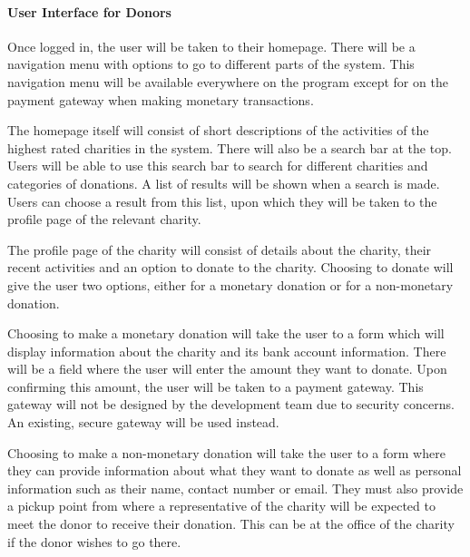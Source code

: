 \documentclass{scrreprt}
\begin{document}
                \paragraph{User Interface for Donors}\mbox{}\par
    
                Once logged in, the user will be taken to their homepage. There will be a navigation menu with options to go to different parts of the system. This navigation menu will be available everywhere on the program except for on the payment gateway when making monetary transactions.\par
    
                The homepage itself will consist of short descriptions of the activities of the highest rated charities in the system. There will also be a search bar at the top. Users will be able to use this search bar to search for different charities and categories of donations. A list of results will be shown when a search is made. Users can choose a result from this list, upon which they will be taken to the profile page of the relevant charity.\par
    
                The profile page of the charity will consist of details about the charity, their recent activities and an option to donate to the charity. Choosing to donate will give the user two options, either for a monetary donation or for a non-monetary donation.\par
    
                Choosing to make a monetary donation will take the user to a form which will display information about the charity and its bank account information. There will be a field where the user will enter the amount they want to donate. Upon confirming this amount, the user will be taken to a payment gateway. This gateway will not be designed by the development team due to security concerns. An existing, secure gateway will be used instead.\par
    
                Choosing to make a non-monetary donation will take the user to a form where they can provide information about what they want to donate as well as personal information such as their name, contact number or email. They must also provide a pickup point from where a representative of the charity will be expected to meet the donor to receive their donation. This can be at the office of the charity if the donor wishes to go there.\par
    
\end{document}
